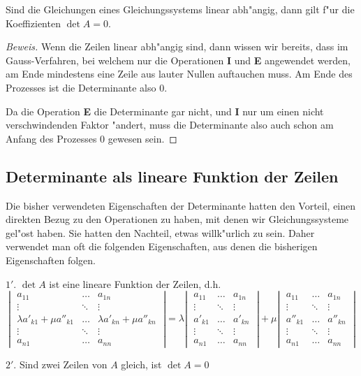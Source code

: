 \begin{hilfssatz}
\label{detlinabh}
Sind die Gleichungen eines Gleichungssystems linear abh"angig, dann
gilt f"ur die Koeffizienten $\det A=0$.
\end{hilfssatz}
\begin{proof}[Beweis]
Wenn die Zeilen linear abh"angig sind, dann wissen wir bereits, dass
im Gauss-Verfahren, bei welchem nur die Operationen {\bf I} und {\bf E}
angewendet werden, am Ende mindestens eine Zeile aus lauter
Nullen auftauchen muss. Am Ende des Prozesses ist die Determinante
also $0$.

Da die Operation {\bf E} die Determinante gar nicht,
und {\bf I} nur um einen nicht verschwindenden Faktor "andert, muss
die Determinante also auch schon am Anfang des Prozesses $0$ gewesen
sein.
\end{proof}

\subsection{Determinante als lineare Funktion der Zeilen\label{detlinfun}}
Die bisher verwendeten Eigenschaften der Determinante hatten den
Vorteil, einen direkten Bezug zu den Operationen zu haben, mit 
denen wir Gleichungssysteme gel"ost haben. Sie hatten den
Nachteil, etwas willk"urlich zu sein.
Daher verwendet man oft die folgenden Eigenschaften, aus denen
die bisherigen Eigenschaften folgen.

\begin{compactenum}
\item[$1'$.] $\det A$ ist eine lineare Funktion der Zeilen, d.h.
\[
\left|
\;
\begin{matrix}
a_{11}&\dots&a_{1n}\\
\vdots&\ddots&\vdots\\
\lambda a'_{k1}+\mu a''_{k1}&\dots&\lambda a'_{kn}+\mu a''_{kn}\\
\vdots&\ddots&\vdots\\
a_{n1}&\dots&a_{nn}
\end{matrix}
\;
\right|
=
\lambda
\left|
\;
\begin{matrix}
a_{11}&\dots&a_{1n}\\
\vdots&\ddots&\vdots\\
a'_{k1}&\dots&a'_{kn}\\
\vdots&\ddots&\vdots\\
a_{n1}&\dots&a_{nn}
\end{matrix}
\;
\right|
+
\mu
\left|
\;
\begin{matrix}
a_{11}&\dots&a_{1n}\\
\vdots&\ddots&\vdots\\
a''_{k1}&\dots&a''_{kn}\\
\vdots&\ddots&\vdots\\
a_{n1}&\dots&a_{nn}
\end{matrix}
\;
\right|
\]
\item[$2'$.] Sind zwei Zeilen von $A$ gleich, ist $\det A=0$
\end{compactenum}

